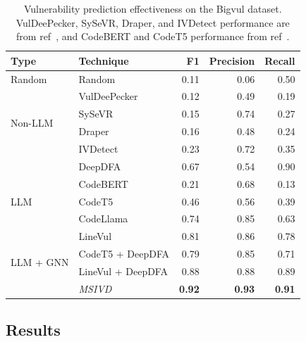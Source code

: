 \documentclass[12pt,openany,oneside,table]{cmuthesis}
\begin{document}
\begin{table}[t!]
  \centering
\caption{\small Vulnerability prediction effectiveness on the Bigvul dataset. VulDeePecker, SySeVR, Draper, and IVDetect performance are from ref~\cite{ivdetect}, and CodeBERT and CodeT5 performance from ref~\cite{deepdfa}.
}
\begin{tabular}{l|lrrr}
\toprule \textbf{Type} & \textbf{Technique} &
 \textbf{F1} & \textbf{Precision} & \textbf{Recall}\\
\midrule

\multirow{1}{*}{Random} &
Random & 0.11  & 0.06  & 0.50   \\
\cmidrule{1-5}

\multirow{4}{*}{\parbox{0.9cm}{Non-LLM}}
& VulDeePecker & 0.12  & 0.49  & 0.19   \\
& SySeVR & 0.15  & 0.74  & 0.27   \\
& Draper& 0.16  & 0.48 & 0.24   \\
& IVDetect& 0.23  & 0.72 & 0.35   \\
& DeepDFA & 0.67  & 0.54 & 0.90   \\
\cmidrule{1-5}

\multirow{3}{*}{LLM}
& CodeBERT              & 0.21  & 0.68  & 0.13   \\
& CodeT5               & 0.46  & 0.56  & 0.39   \\
& CodeLlama            & 0.74  & 0.85  & 0.63 \\
& LineVul  & 0.81  & 0.86  & 0.78   \\
\cmidrule{1-5}
\multirow{2}{*}{LLM + GNN}
& CodeT5 + DeepDFA    & 0.79  & 0.85  & 0.71   \\
& LineVul + DeepDFA  & 0.88  & 0.88  & 0.89   \\
& \cellcolor{black!25} \textit{MSIVD}   &  \textbf{0.92} &  \textbf{0.93} &\textbf{ 0.91 }  \\


\bottomrule
\end{tabular}
\label{table:multift_results}
\end{table}

\subsection{Results}
\end{document}

